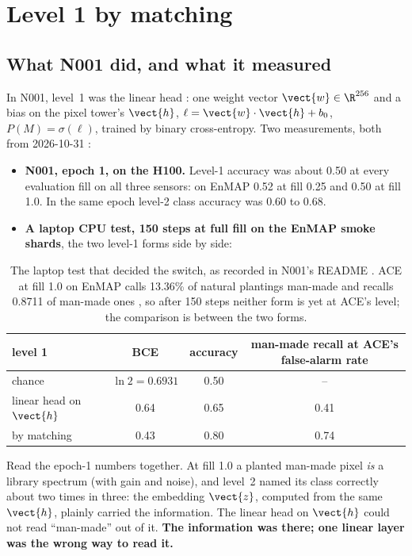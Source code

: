 \section{Level 1 by matching}\label{sec:namer:level1}

\subsection{What N001 did, and what it measured}

In N001, level~1 was the linear head : one weight vector $\vect{w}\in\R^{256}$ and a bias on the
pixel tower's $\vect{h}$, $\ell=\vect{w}\cdot\vect{h}+b_0$, $P(M)=\sigma(\ell)$, trained by binary cross-entropy. Two
measurements, both from 2026-10-31 :
\begin{itemize}
\item \textbf{N001, epoch 1, on the H100.} Level-1 accuracy was about 0.50 at every evaluation fill on all three
sensors: on EnMAP 0.52 at fill 0.25 and 0.50 at fill 1.0. In the same epoch level-2 class accuracy was 0.60 to 0.68.
\item \textbf{A laptop CPU test, 150 steps at full fill on the EnMAP smoke shards}, the two level-1 forms side by side:
\end{itemize}
\begin{table}[htbp]
\centering\small
\begin{tabular}{lccc}
\toprule
level 1 & BCE & accuracy & man-made recall at ACE's false-alarm rate\\
\midrule
chance & $\ln2=0.6931$ & 0.50 & --\\
linear head on $\vect{h}$ & 0.64 & 0.65 & 0.41\\
by matching & 0.43 & 0.80 & 0.74\\
\bottomrule
\end{tabular}
\caption{The laptop test that decided the switch, as recorded in N001's README . ACE at fill 1.0 on
EnMAP calls 13.36\% of natural plantings man-made and recalls 0.8711 of man-made ones \tagC, so after 150 steps neither
form is yet at ACE's level; the comparison is between the two forms.}
\label{tab:namer:l1evidence}
\end{table}

Read the epoch-1 numbers together. At fill 1.0 a planted man-made pixel \emph{is} a library spectrum (with gain and
noise), and level~2 named its class correctly about two times in three: the embedding $\vect{z}$, computed from the
same $\vect{h}$, plainly carried the information. The linear head on $\vect{h}$ could not read ``man-made'' out of it.
\textbf{The information was there; one linear layer was the wrong way to read it.}

